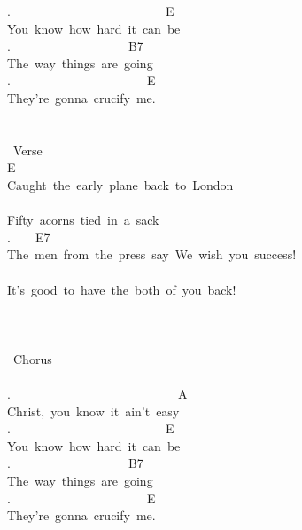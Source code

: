 {.\ \ \ \ \ \ \ \ \ \ \ \ \ \ \ \ \ \ \ \ \ \ \ \ \ E\\
You\ know\ how\ hard\ it\ can\ be\\
.\ \ \ \ \ \ \ \ \ \ \ \ \ \ \ \ \ \ \ B7\\
The\ way\ things\ are\ going\ \\
.\ \ \ \ \ \ \ \ \ \ \ \ \ \ \ \ \ \ \ \ \ \ E\\
They're\ gonna\ crucify\ me.\\
\\
\\
\lbrack\ Verse\rbrack\\
E\\
Caught\ the\ early\ plane\ back\ to\ London\\
\\
Fifty\ acorns\ tied\ in\ a\ sack\\
.\ \ \ \ E7\\
The\ men\ from\ the\ press\ say\ \;We\ wish\ you\ success!\;\\
\\
\;It's\ good\ to\ have\ the\ both\ of\ you\ back!\;\\
\\
\\
\\
\lbrack\ Chorus\rbrack\\
\\
.\ \ \ \ \ \ \ \ \ \ \ \ \ \ \ \ \ \ \ \ \ \ \ \ \ \ \ A\\
Christ,\ you\ know\ it\ ain't\ easy\\
.\ \ \ \ \ \ \ \ \ \ \ \ \ \ \ \ \ \ \ \ \ \ \ \ \ E\\
You\ know\ how\ hard\ it\ can\ be\\
.\ \ \ \ \ \ \ \ \ \ \ \ \ \ \ \ \ \ \ B7\\
The\ way\ things\ are\ going\\
.\ \ \ \ \ \ \ \ \ \ \ \ \ \ \ \ \ \ \ \ \ \ E\\
They're\ gonna\ crucify\ me.}
